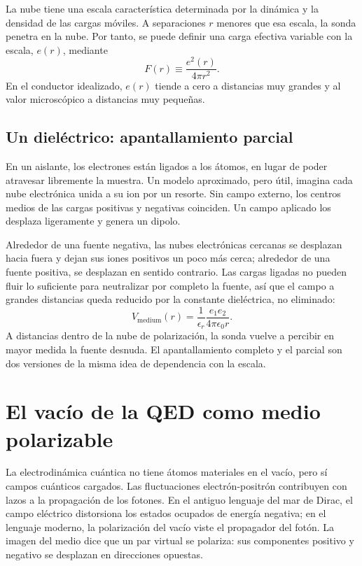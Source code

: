 La nube tiene una escala característica determinada por la dinámica y la densidad de las cargas móviles. A separaciones \(r\) menores que esa escala, la sonda penetra en la nube. Por tanto, se puede definir una carga efectiva variable con la escala, \(e(r)\), mediante
\begin{equation}
  F(r)\equiv\frac{e^2(r)}{4\pi r^2}.
  \label{eq:l10-running-charge-definition}
\end{equation}
En el conductor idealizado, \(e(r)\) tiende a cero a distancias muy grandes y al valor microscópico a distancias muy pequeñas.

\subsection{Un dieléctrico: apantallamiento parcial}

En un aislante, los electrones están ligados a los átomos, en lugar de poder atravesar libremente la muestra. Un modelo aproximado, pero útil, imagina cada nube electrónica unida a su ion por un resorte. Sin campo externo, los centros medios de las cargas positivas y negativas coinciden. Un campo aplicado los desplaza ligeramente y genera un dipolo.

Alrededor de una fuente negativa, las nubes electrónicas cercanas se desplazan hacia fuera y dejan sus iones positivos un poco más cerca; alrededor de una fuente positiva, se desplazan en sentido contrario. Las cargas ligadas no pueden fluir lo suficiente para neutralizar por completo la fuente, así que el campo a grandes distancias queda reducido por la constante dieléctrica, no eliminado:
\begin{equation}
  V_{\mathrm{medium}}(r)
  =
  \frac{1}{\epsilon_r}
  \frac{e_1e_2}{4\pi\epsilon_0r}.
  \label{eq:l10-dielectric-coulomb}
\end{equation}
A distancias dentro de la nube de polarización, la sonda vuelve a percibir en mayor medida la fuente desnuda. El apantallamiento completo y el parcial son dos versiones de la misma idea de dependencia con la escala.

\section{El vacío de la QED como medio polarizable}

La electrodinámica cuántica no tiene átomos materiales en el vacío, pero sí campos cuánticos cargados. Las fluctuaciones electrón-positrón contribuyen con lazos a la propagación de los fotones. En el antiguo lenguaje del mar de Dirac, el campo eléctrico distorsiona los estados ocupados de energía negativa; en el lenguaje moderno, la polarización del vacío viste el propagador del fotón. La imagen del medio dice que un par virtual se polariza: sus componentes positivo y negativo se desplazan en direcciones opuestas.

